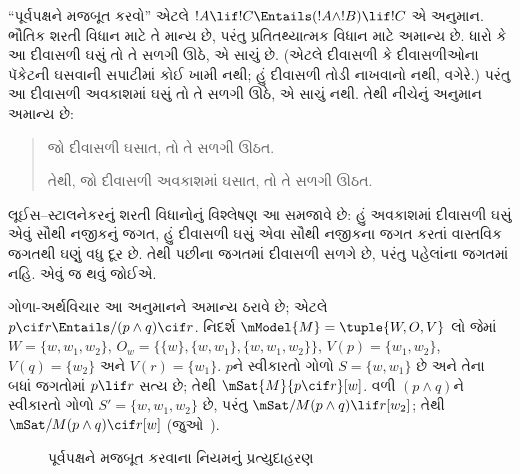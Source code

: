 \begingroup
\makeatletter{}\makeatother


\label{guunit:OLP-0526}


``પૂર્વપક્ષને મજબૂત કરવો'' એટલે
$!A \lif !C \Entails (!A \land !B) \lif !C$ એ અનુમાન.
ભૌતિક શરતી વિધાન માટે તે માન્ય છે, પરંતુ પ્રતિતથ્યાત્મક વિધાન માટે
અમાન્ય છે. ધારો કે આ દીવાસળી ઘસું તો તે સળગી ઊઠે, એ સાચું છે.
(એટલે દીવાસળી કે દીવાસળીઓના પૅકેટની ઘસવાની સપાટીમાં કોઈ ખામી નથી;
હું દીવાસળી તોડી નાખવાનો નથી, વગેરે.) પરંતુ આ દીવાસળી અવકાશમાં
ઘસું તો તે સળગી ઊઠે, એ સાચું નથી. તેથી નીચેનું અનુમાન અમાન્ય છે:
\begin{quote}
  જો દીવાસળી ઘસાત, તો તે સળગી ઊઠત.

  તેથી, જો દીવાસળી અવકાશમાં ઘસાત, તો તે સળગી ઊઠત.
\end{quote}

લૂઈસ--સ્ટાલનેકરનું શરતી વિધાનોનું વિશ્લેષણ આ સમજાવે છે: હું
અવકાશમાં દીવાસળી ઘસું એવું સૌથી નજીકનું જગત, હું દીવાસળી ઘસું
એવા સૌથી નજીકના જગત કરતાં વાસ્તવિક જગતથી ઘણું વધુ દૂર છે. તેથી
પછીના જગતમાં દીવાસળી સળગે છે, પરંતુ પહેલાંના જગતમાં નહિ. એવું જ
થવું જોઈએ.

\begin{ex}
  ગોળા-અર્થવિચાર આ અનુમાનને અમાન્ય ઠરાવે છે; એટલે $p
  \cif r \Entails/ (p \land q) \cif r$. નિદર્શ $\mModel{M}
  = \tuple{W, O, V}$ લો જેમાં $W = \{w, w_1, w_2\}$,
  $O_w = \{\{w\}, \{w, w_1\}, \{w, w_1, w_2\}\}$,
  $V(p) = \{w_1, w_2\}$, $V(q) = \{w_2\}$ અને
  $V(r) = \{w_1\}$. $p$ને સ્વીકારતો ગોળો $S = \{w,
  w_1\}$ છે અને તેના બધાં જગતોમાં $p \lif r$ સત્ય છે; તેથી
  $\mSat{M}{p \cif r}[w]$. વળી $(p \land q)$ને સ્વીકારતો ગોળો
  $S' = \{w, w_1, w_2\}$ છે, પરંતુ
  $\mSat/{M}{(p \land q) \lif r}[w_2]$; તેથી
  $\mSat/{M}{(p \land q) \cif r}[w]$ (જુઓ~).

\begin{figure}
\begin{center}
\caption{પૂર્વપક્ષને મજબૂત કરવાના નિયમનું પ્રત્યુદાહરણ}
\end{center}
\end{figure}
\end{ex}
\endgroup


